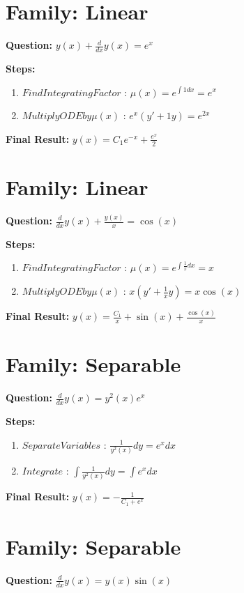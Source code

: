 \documentclass{article}
\begin{document}
\section*{Family: Linear}
\textbf{Question:} $y{\left(x \right)} + \frac{d}{d x} y{\left(x \right)} = e^{x}$

\textbf{Steps:}
\begin{enumerate}
\item $Find Integrating Factor$ :  $\mu(x) = e^{\int 1 dx} = e^{x}$
\item $Multiply ODE by \mu(x)$ :  $e^{x}(y' + 1y) = e^{2 x}$
\end{enumerate}
\textbf{Final Result:} $y{\left(x \right)} = C_{1} e^{- x} + \frac{e^{x}}{2}$

\section*{Family: Linear}
\textbf{Question:} $\frac{d}{d x} y{\left(x \right)} + \frac{y{\left(x \right)}}{x} = \cos{\left(x \right)}$

\textbf{Steps:}
\begin{enumerate}
\item $Find Integrating Factor$ :  $\mu(x) = e^{\int \frac{1}{x} dx} = x$
\item $Multiply ODE by \mu(x)$ :  $x(y' + \frac{1}{x}y) = x \cos{\left(x \right)}$
\end{enumerate}
\textbf{Final Result:} $y{\left(x \right)} = \frac{C_{1}}{x} + \sin{\left(x \right)} + \frac{\cos{\left(x \right)}}{x}$

\section*{Family: Separable}
\textbf{Question:} $\frac{d}{d x} y{\left(x \right)} = y^{2}{\left(x \right)} e^{x}$

\textbf{Steps:}
\begin{enumerate}
\item $Separate Variables$ :  $\frac{1}{y^{2}{\left(x \right)}} dy = e^{x} dx$
\item $Integrate$ :  $\int \frac{1}{y^{2}{\left(x \right)}} dy = \int e^{x} dx$
\end{enumerate}
\textbf{Final Result:} $y{\left(x \right)} = - \frac{1}{C_{1} + e^{x}}$

\section*{Family: Separable}
\textbf{Question:} $\frac{d}{d x} y{\left(x \right)} = y{\left(x \right)} \sin{\left(x \right)}$
\end{document}
